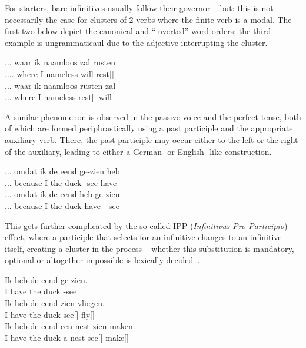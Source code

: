 For starters, bare infinitives usually follow their governor -- but: this is not necessarily the case for clusters of 2 verbs where the finite verb is a modal.
The first two  below depict the canonical and ``inverted'' word orders; the third example is ungrammaticaul due to the adjective  interrupting the cluster.
\begin{exe}
\ex\label{gloss:rusten_zal}
\begin{xlist}
\ex
\gll ... waar ik naamloos zal rusten\\
.... where I nameless will rest[]\\
\ex
\gll ... waar ik naamloos rusten zal\\
... where I nameless rest[] will\\
\end{xlist}
\end{exe}
A similar phenomenon is observed in the passive voice and the perfect tense, both of which are formed periphrastically using a past participle and the appropriate auxiliary verb.
There, the past participle may occur either to the left or the right of the auxiliary, leading to either a German- or English- like construction.
\begin{exe}
\ex\label{gloss:green_vs_red}
\begin{xlist}
\ex
\gll ... omdat ik de eend ge-zien heb\\
... because I the duck -see have-\\
\ex
\gll ... omdat ik de eend heb ge-zien\\
... because I the duck have- -see\\
\end{xlist}
\end{exe}
This gets further complicated by the so-called IPP (\textit{Infinitivus Pro Participio}) effect, where a participle that selects for an infinitive changes to an infinitive itself, creating a cluster in the process -- whether this substitution is mandatory, optional or altogether impossible is lexically decided~\cite{augustinus2015complement}.
\begin{exe}
\ex\label{gloss:ipp}
\begin{xlist}
\ex 
\gll Ik heb de eend ge-zien.\\
I have the duck -see\\
\ex
\gll Ik heb de eend zien vliegen.\\
I have the duck see[] fly[]\\
\ex\label{gloss:ipp_tv}
\gll Ik heb de eend een nest zien maken.\\
I have the duck a nest see[] make[]\\
\end{xlist}
\end{exe}

